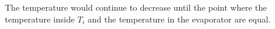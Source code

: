 The temperature would continue to decrease until the point where the temperature inside \( T_{i} \) and the temperature in the evaporator are equal.